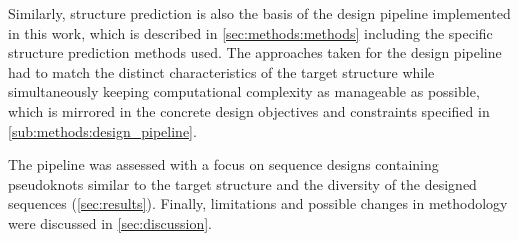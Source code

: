 \documentclass[../../master.tex]{subfiles}
\begin{document}
Similarly, structure prediction is also the basis of the design pipeline implemented in this work, which is described in \autoref{sec:methods:methods} including the specific structure prediction methods used.
The approaches taken for the design pipeline had to match the distinct characteristics of the target structure while simultaneously keeping computational complexity as manageable as possible, which is mirrored in the concrete design objectives and constraints specified in \autoref{sub:methods:design_pipeline}.

The pipeline was assessed with a focus on sequence designs containing pseudoknots similar to the target structure and the diversity of the designed sequences (\autoref{sec:results}).
Finally, limitations and possible changes in methodology were discussed in \autoref{sec:discussion}.
\end{document}
